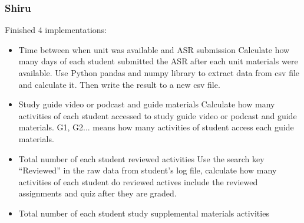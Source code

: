 \documentclass[12pt]{article}
\begin{document}
	\subsubsection{Shiru}
	Finished 4 implementations:
	\begin{itemize}
		\item Time between when unit was available and ASR submission
Calculate how many days of each student submitted the ASR after each unit materials were available. Use Python pandas and numpy library to extract data from csv file and calculate it. Then write the result to a new csv file.
		\item Study guide video or podcast and guide materials
Calculate how many activities of each student accessed to study guide video or podcast and guide materials. G1, G2... means how many activities of student access each guide materials.
		\item Total number of each student reviewed activities
Use the search key “Reviewed” in the raw data from student’s log file, calculate how many activities of each student do reviewed actives include the reviewed assignments and quiz after they are graded.
		\item Total number of each student study supplemental materials activities
	\end{itemize}
\end{document}
